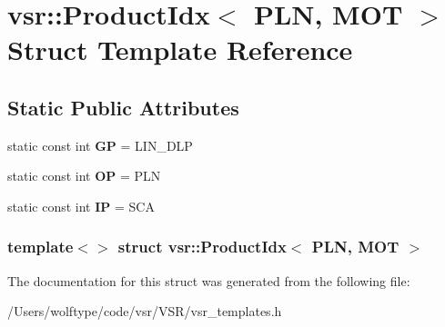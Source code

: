 \hypertarget{structvsr_1_1_product_idx_3_01_p_l_n_00_01_m_o_t_01_4}{\section{vsr\-:\-:Product\-Idx$<$ P\-L\-N, M\-O\-T $>$ Struct Template Reference}
\label{structvsr_1_1_product_idx_3_01_p_l_n_00_01_m_o_t_01_4}
}
\subsection*{Static Public Attributes}
\begin{DoxyCompactItemize}
\item 
\hypertarget{structvsr_1_1_product_idx_3_01_p_l_n_00_01_m_o_t_01_4_a8d5231c1c6f5e1a34a79ae12f2d17399}{static const int {\bfseries G\-P} = L\-I\-N\-\_\-\-D\-L\-P}\label{structvsr_1_1_product_idx_3_01_p_l_n_00_01_m_o_t_01_4_a8d5231c1c6f5e1a34a79ae12f2d17399}

\item 
\hypertarget{structvsr_1_1_product_idx_3_01_p_l_n_00_01_m_o_t_01_4_a45d61dec8ee02d023189c018cde087d5}{static const int {\bfseries O\-P} = P\-L\-N}\label{structvsr_1_1_product_idx_3_01_p_l_n_00_01_m_o_t_01_4_a45d61dec8ee02d023189c018cde087d5}

\item 
\hypertarget{structvsr_1_1_product_idx_3_01_p_l_n_00_01_m_o_t_01_4_ad3b3b190efa686b6b0e959a72c1e2923}{static const int {\bfseries I\-P} = S\-C\-A}\label{structvsr_1_1_product_idx_3_01_p_l_n_00_01_m_o_t_01_4_ad3b3b190efa686b6b0e959a72c1e2923}

\end{DoxyCompactItemize}
\subsubsection*{template$<$$>$ struct vsr\-::\-Product\-Idx$<$ P\-L\-N, M\-O\-T $>$}



The documentation for this struct was generated from the following file\-:\begin{DoxyCompactItemize}
\item 
/\-Users/wolftype/code/vsr/\-V\-S\-R/vsr\-\_\-templates.\-h\end{DoxyCompactItemize}
